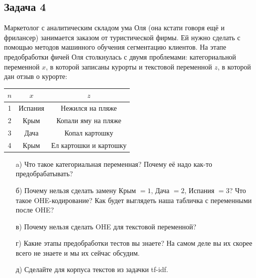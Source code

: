 \documentclass[12pt, a4paper, oneside]{article}
\begin{document}
\subsection*{Задача 4} 

Маркетолог с аналитическим складом ума Оля (она кстати говоря ещё и фрилансер) занимается заказом от туристической фирмы. Ей нужно сделать с помощью методов машинного обучения сегментацию клиентов. На этапе предобработки фичей Оля столкнулась с двумя проблемами: категориальной переменной $x$, в которой записаны курорты и текстовой переменной $z$, в которой дан отзыв о курорте:

\begin{center}
	\begin{tabular}{c|c|c}
		\hline
		$n$ & $x$ & $z$ \\
		\hline
		1 & Испания  & Нежился на пляже  \\
		2 & Крым  &  Копали яму на пляже\\
		3 & Дача  &  Копал картошку  \\
		4 & Крым  & Ел картошки и картошку \\
	\end{tabular}
\end{center}

\begin{enumerate} 
	\item[a)]  Что такое категориальная переменная? Почему её надо как-то предобрабатывать? 
	\item[б)]  Почему нельзя сделать замену Крым $=1$, Дача $=2$, Испания $=3$? Что такое OHE-кодирование? Как будет выглядеть наша табличка с переменными после OHE?
	\item[в)]  Почему нельзя сделать OHE для текстовой переменной?
	\item[г)]  Какие этапы предобработки тестов вы знаете? На самом деле вы их скорее всего не знаете и мы их сейчас обсудим. 
	\item[д)] Сделайте для корпуса текстов из задачки tf-idf. 
\end{enumerate}
\end{document}
